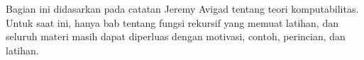 \documentclass[../../include/open-logic-part]{subfiles}
\begin{document}

\begin{editorial}
  Bagian ini didasarkan pada catatan Jeremy Avigad tentang teori
  komputabilitas. Untuk saat ini, hanya bab tentang fungsi rekursif yang
  memuat latihan, dan seluruh materi masih dapat diperluas dengan motivasi,
  contoh, perincian, dan latihan.
\end{editorial}



\OLEndPartHook
\end{document}
